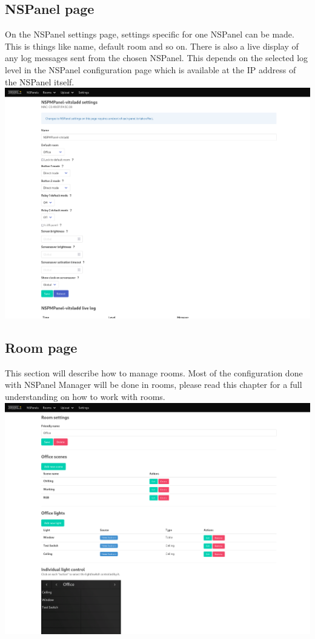 \documentclass[10pt]{article}
\begin{document}
    \subsection{NSPanel page}
    \label{sec:nspanel_page}
    On the NSPanel settings page, settings specific for one NSPanel can be made. This is things like name, default room and so on. There is also a live display of any log messages sent from the chosen NSPanel. This depends on the selected log level in the NSPanel configuration page which is available at the IP address of the NSPanel itself.
    \\
    \includegraphics[width=\textwidth,height=\textheight,keepaspectratio]{nspanel_page.png}
    \subsection{Room page}
    \label{sec:room_page}
    This section will describe how to manage rooms. Most of the configuration done with NSPanel Manager will be done in rooms, please read this chapter for a full understanding on how to work with rooms.
    \\
    \includegraphics[width=\textwidth,height=\textheight,keepaspectratio]{room_page.png}
\end{document}
